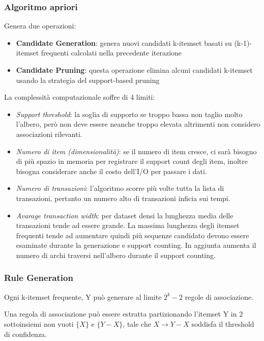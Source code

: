 \subsubsection{Algoritmo apriori}
Genera due operazioni:
\begin{itemize}
	\item \textbf{Candidate Generation}: genera nuovi candidati k-itemset basati su (k-1)-itemset frequenti calcolati nella precedente iterazione
	\item \textbf{Candidate Pruning}: questa operazione elimina alcuni candidati k-itemset usando la strategia del support-based pruning
\end{itemize}

La complessit\`a computazionale soffre di 4 limiti:
\begin{itemize}
	\item \textit{Support threshold}: la soglia di supporto se troppo bassa non taglio molto l'albero, però non deve essere neanche troppo elevata altrimenti non considero associazioni rilevanti. 
	\item \textit{Numero di item (dimensionalit\`a)}: se il numero di item cresce, ci sar\`a bisogno di più spazio in memoria per registrare il support count degli item, inoltre bisogna considerare anche il costo dell'I/O per passare i dati.
	\item \textit{Numero di transazioni}: l'algoritmo scorre più volte tutta la lista di transazioni, pertanto un numero alto di transazioni inficia sui tempi.
	\item \textit{Avarage transaction width}: per dataset densi la lunghezza media delle transazioni tende ad essere grande. La massima lunghezza degli itemset frequenti tende ad aumentare quindi più sequenze candidato devono essere esaminate durante la generazione e support counting. In aggiunta aumenta il numero di archi traversi nell'albero durante il support counting.
\end{itemize}

\subsubsection{Rule Generation}
Ogni k-itemset frequente, Y pu\`o generare al limite $2^k-2$ regole di associazione. 

Una regola di associazione pu\`o essere estratta partizionando l'itemset Y in 2 sottoinsiemi non vuoti $\{X\}$ e $\{Y-X\}$, tale che $X \rightarrow Y -X$ soddisfa il threshold di confidenza.

